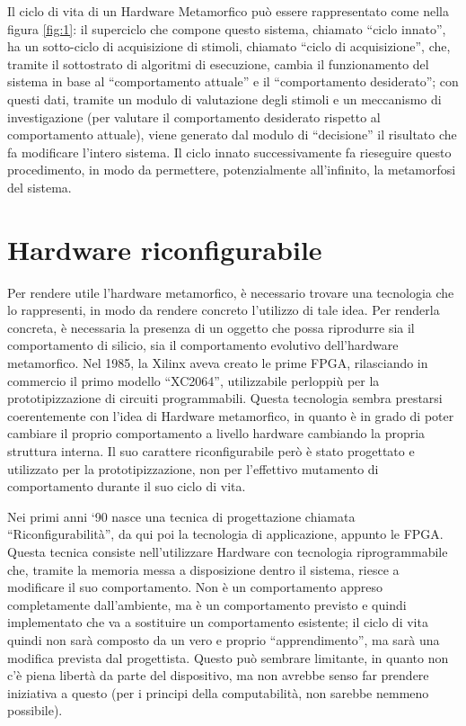 \documentclass[11pt]{article} %
\begin{document}
Il ciclo di vita di un Hardware Metamorfico può essere rappresentato come nella figura \ref{fig:1}: il superciclo che compone questo sistema, chiamato ``ciclo innato'', ha un sotto-ciclo di acquisizione di stimoli, chiamato ``ciclo di acquisizione'', che, tramite il sottostrato di algoritmi di esecuzione, cambia il funzionamento del sistema in base al ``comportamento attuale'' e il ``comportamento desiderato''; con questi dati, tramite un modulo di valutazione degli stimoli e un meccanismo di investigazione (per valutare il comportamento desiderato rispetto al comportamento attuale), viene generato dal modulo di ``decisione'' il risultato che fa modificare l'intero sistema. Il ciclo innato successivamente fa rieseguire questo procedimento, in modo da permettere, potenzialmente all'infinito, la metamorfosi del sistema.

\section{Hardware riconfigurabile}

Per rendere utile l'hardware metamorfico, è necessario trovare una tecnologia che lo rappresenti, in modo da rendere concreto l'utilizzo di tale idea. Per renderla concreta, è necessaria la presenza di un oggetto che possa riprodurre sia il comportamento di silicio, sia il comportamento evolutivo dell'hardware metamorfico. Nel 1985, la Xilinx aveva creato le prime FPGA, rilasciando in commercio il primo modello ``XC2064'', utilizzabile perloppiù per la prototipizzazione di circuiti programmabili. Questa tecnologia sembra prestarsi coerentemente con l'idea di Hardware metamorfico, in quanto è in grado di poter cambiare il proprio comportamento a livello hardware cambiando la propria struttura interna. Il suo carattere riconfigurabile però è stato progettato e utilizzato per la prototipizzazione, non per l'effettivo mutamento di comportamento durante il suo ciclo di vita. 

Nei primi anni `90 nasce una tecnica di progettazione chiamata ``Riconfigurabilità'', da qui poi la tecnologia di applicazione, appunto le FPGA. Questa tecnica consiste nell'utilizzare Hardware con tecnologia riprogrammabile che, tramite la memoria messa a disposizione dentro il sistema, riesce a modificare il suo comportamento. Non è un comportamento appreso completamente dall'ambiente, ma è un comportamento previsto e quindi implementato che va a sostituire un comportamento esistente; il ciclo di vita quindi non sarà composto da un vero e proprio ``apprendimento'', ma sarà una modifica prevista dal progettista. Questo può sembrare limitante, in quanto non c'è piena libertà da parte del dispositivo, ma non avrebbe senso far prendere iniziativa a questo (per i principi della computabilità, non sarebbe nemmeno possibile).
\end{document}
